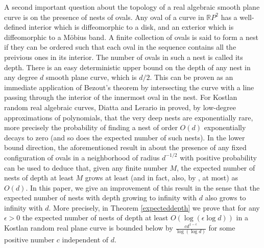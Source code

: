 \documentclass [11pt]{amsart}
\theoremstyle{remark}
\numberwithin{equation}{section}
\numberwithin{theorem}{section}
\begin{document}
A second important question about the topology of a real algebraic smooth plane curve is on the presence of nests of ovals. Any oval of a curve in $\mathbb{R}P^2$ has a well-defined interior which is diffeomorphic to a disk, and an exterior which is diffeomorphic to a M\"obius band. A finite collection of ovals is said to form a nest if they can be ordered such that each oval in the sequence contains all the preivious ones in its interior. The number of ovals in such a nest is called its depth. There is an easy deterministic upper bound on the depth of any nest in any degree $d$ smooth plane curve, which is $\displaystyle{d/2}$. This can be proven as an immediate application of Bezout's theorem by intersecting the curve with a line passing through the interior of the innermost oval in the nest. For Kostlan random real algebraic curves, Diatta and Lerario in \cite{DL} proved, by low-degree approximations of polynomials, that the very deep nests are exponentially rare, more precisely the probability of finding a nest of order $O(d)$ exponentially decays to zero (and so does the expected number of such nests). In the lower bound direction, the aforementioned result in \cite{GW2} about the presence of any fixed configuration of ovals in a neighborhood of radius $\displaystyle{d^{-1/2}}$ with positive probability can be used to deduce that, given any finite number $M$, the expected number of nests of depth at least $M$ grows at least (and in fact, also, by \cite{GW1}, at most) as $O(d)$. 
In this paper, we give an improvement of this result in the sense that the expected number of nests with depth growing to infinity with $d$ also grows to infinity with $d$. More precisely, in Theorem \ref{expecteddepth} we prove that for any $\epsilon>0$ the expected number of nests of depth at least $O(\log(\epsilon\log d))$ in a Kostlan random real plane curve is bounded below by $\displaystyle{\frac{cd^{1-\epsilon}}{\log(\log d)}}$ for some positive number $c$ independent of $d$. 
\end{document}
